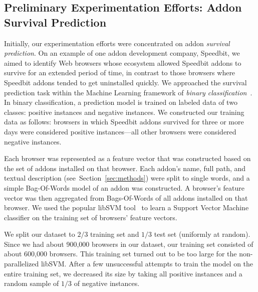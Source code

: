 \documentclass[11pt,oneside]{book}
\let\Oldsubsection\subsection
\renewcommand{\subsection}{\FloatBarrier\Oldsubsection}
\begin{document}

\subsection{Preliminary Experimentation Efforts: Addon Survival Prediction}
Initially, our experimentation efforts were concentrated on addon \emph{survival prediction}. On an example of one addon development company, Speedbit, we aimed to identify Web browsers whose ecosystem allowed Speedbit addons to survive for an extended period of time, in contrast to those browsers where Speedbit addons tended to get uninstalled quickly. We approached the survival prediction task within the Machine Learning framework of \emph{binary classification}~\citep{sebastiani02}. In binary classification, a prediction model is trained on labeled data of two classes: positive instances and negative instances. We constructed our training data as follows: browsers in which Speedbit addons survived for three or more days were considered positive instances---all other browsers were considered negative instances. 

Each browser was represented as a feature vector that was constructed based on the set of addons installed on that browser. Each addon's name, full path, and textual description (see~Section~\ref{sec:methods}) were split to single words, and a simple Bag-Of-Words model of an addon was constructed. A browser's feature vector was then aggregated from Bags-Of-Words of all addons installed on that browser. We used the popular libSVM tool~\citep{chang2011libsvm} to learn a Support Vector Machine classifier on the training set of browsers' feature vectors.

We split our dataset to $2/3$ training set and $1/3$ test set (uniformly at random). Since we had about 900,000 browsers in our dataset, our training set consisted of about 600,000 browsers. This training set turned out to be too large for the non-parallelized libSVM. After a few unsuccessful attempts to train the model on the entire training set, we decreased its size by taking all positive instances and a random sample of $1/3$ of negative instances.
\end{document}
